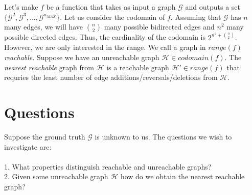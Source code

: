 \documentclass{article}
\theoremstyle{definition}
\begin{document}
\\
\\
Let's make $f$ be a function that takes as input a graph $\mathcal{G}$ and outputs a set $\{\mathcal{G}^2,\mathcal{G}^3,...,\mathcal{G}^{u_{MAX}}\}$. Let us consider the codomain of $f$. Assuming that $\mathcal{G}$ has $n$ many edges, we will have ${n \choose 2}$ many possible bidirected edges and $n^2$ many possible directed edges. Thus, the cardinality of the codomain is $2^{n^2+{n \choose 2}}$. However, we are only interested in the range. We call a graph in $range(f)$ \textit{reachable}. Suppose we have an unreachable graph $\mathcal{H} \in codomain(f)$. The \textit{nearest reachable} graph from $\mathcal{H}$ is a reachable graph $\mathcal{H'} \in range(f)$ that requries the least number of edge additions/reversals/deletions from $\mathcal{H}$.

\newpage

\section{Questions}

Suppose the ground truth $\mathcal{G}$ is unknown to us. The questions we wish to investigate are:
\\
\\
1. What properties distinguish reachable and unreachable graphs? 
\\
2. Given some unreachable graph $\mathcal{H}$ how do we obtain the nearest reachable graph?




	


\end{document}
